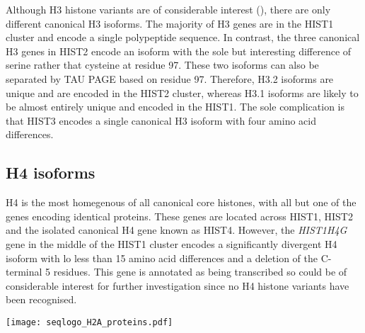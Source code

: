 	Although H3 histone variants are of considerable interest (), 
	there are only \HThreeUniqueProteins{} different canonical H3 isoforms. 
	The majority of H3 genes are in the HIST1 cluster 
	and encode a single polypeptide sequence. 
	In contrast, the three canonical H3 genes in HIST2 encode an isoform 
	with the sole but interesting difference of serine rather that cysteine at residue 97.
	These two isoforms can also be separated by TAU PAGE based on residue 97. 
	Therefore, H3.2 isoforms are unique and are encoded in the HIST2 cluster, 
	whereas H3.1 isoforms are likely to be almost entirely unique and encoded in the HIST1. 
	The sole complication is that HIST3 encodes a single canonical H3 isoform 
	with four amino acid differences.
	
  \subsection{H4 isoforms}
	H4 is the most homegenous of all canonical core histones, 
	with all but one of the \HFourCodingGenes{} genes encoding identical proteins. 
	These genes are located across HIST1, HIST2 
	and the isolated canonical H4 gene known as HIST4.
	However, the \textit{HIST1H4G} gene in the middle of the HIST1 cluster 
	encodes a significantly divergent H4 isoform 
	with lo less than 15 amino acid differences and a deletion of the C-terminal 5 residues. 
	This gene is annotated as being transcribed 
	so could be of considerable interest for further investigation 
	since no H4 histone variants have been recognised.


  \begin{TableAndFigure*}
    \label{tab:H2A-consensus}
    

    \texttt{[image: seqlogo\_H2A\_proteins.pdf]}
    \label{fig:H2A-weblogo}
  \end{TableAndFigure*}


